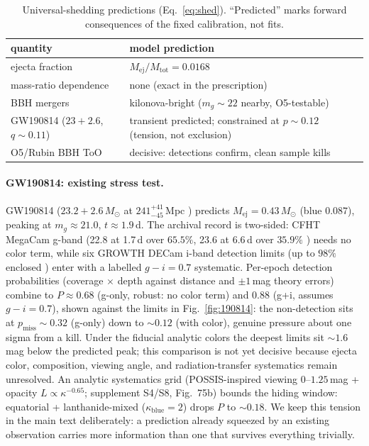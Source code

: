 \documentclass[11pt]{article}
\begin{document}
\begin{table}[ht]\centering\small
\caption{Universal-shedding predictions (Eq.~\ref{eq:shed}). ``Predicted'' marks
forward consequences of the fixed calibration, not fits.}
\label{tab:univ}
\begin{tabular}{@{}l p{7.5cm}@{}}\toprule
quantity & model prediction \\\midrule
ejecta fraction & $M_{\mathrm{ej}}/M_{\mathrm{tot}} = 0.0168$ \\
mass-ratio dependence & none (exact in the prescription) \\
BBH mergers & kilonova-bright ($m_g \sim 22$ nearby, O5-testable) \\
GW190814 ($23+2.6$, $q \sim 0.11$) & transient predicted; constrained at $p \sim 0.12$ (tension, not exclusion) \\
O5/Rubin BBH ToO & decisive: detections confirm, clean sample kills \\\bottomrule
\end{tabular}
\end{table}

\paragraph{GW190814: existing stress test.}
GW190814 ($23.2+2.6\,M_\odot$ at $241^{+41}_{-45}$\,Mpc \cite{GW190814})
predicts $M_{\mathrm{ej}} = 0.43\,M_\odot$ (blue $0.087$), peaking at
$m_g \approx 21.0$, $t \approx 1.9$\,d. The archival record is
two-sided: CFHT MegaCam g-band (22.8 at 1.7\,d over $65.5\%$, 23.6 at
6.6\,d over $35.9\%$ \cite{CFHT190814}) needs no color term, while six
GROWTH DECam i-band detection limits (up to $98\%$ enclosed
\cite{GROWTH190814}) enter with a labelled $g-i = 0.7$ systematic.
Per-epoch detection probabilities (coverage $\times$ depth against
distance and $\pm 1$\,mag theory errors) combine to $P \approx 0.68$
(g-only, robust: no color term) and $0.88$ (g+i, assumes $g-i = 0.7$),
shown against the limits in Fig.~\ref{fig:190814}: the non-detection sits
at $p_{\mathrm{miss}} \sim 0.32$ (g-only) down to $\sim 0.12$ (with color),
genuine pressure about one sigma from a kill. Under the fiducial
analytic colors the deepest limits sit $\sim 1.6$\,mag below the
predicted peak; this comparison is not yet decisive because ejecta
color, composition, viewing angle, and radiation-transfer systematics
remain unresolved. An analytic systematics grid (POSSIS-inspired viewing
$0$--$1.25$\,mag + opacity $L \propto \kappa^{-0.65}$; supplement S4/S8,
Fig.~75b) bounds the hiding window: equatorial + lanthanide-mixed
($\kappa_{\mathrm{blue}} = 2$) drops $P$ to $\sim 0.18$. We keep this tension in the main text deliberately:
a prediction already squeezed by an existing observation carries more
information than one that survives everything trivially.
\end{document}
